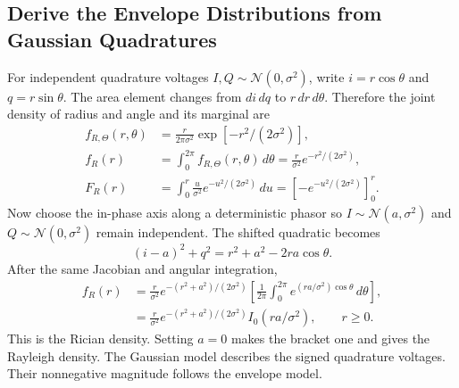 \documentclass[12pt,a4paper]{article}
\begin{document}
\subsection{Derive the Envelope Distributions from Gaussian Quadratures}
For independent quadrature voltages $I,Q\sim\mathcal N(0,\sigma^2)$, write $i=r\cos\theta$ and $q=r\sin\theta$. The area element changes from $di\,dq$ to $r\,dr\,d\theta$. Therefore the joint density of radius and angle and its marginal are
\[
\begin{aligned}
 f_{R,\Theta}(r,\theta)
   &=\frac{r}{2\pi\sigma^2}\exp[-r^2/(2\sigma^2)],\\
 f_R(r)&=\int_0^{2\pi} f_{R,\Theta}(r,\theta)\,d\theta
        =\frac{r}{\sigma^2}e^{-r^2/(2\sigma^2)},\\
 F_R(r)&=\int_0^r\frac{u}{\sigma^2}e^{-u^2/(2\sigma^2)}\,du
        =\left[-e^{-u^2/(2\sigma^2)}\right]_0^r .
\end{aligned}
\]
Now choose the in-phase axis along a deterministic phasor so $I\sim\mathcal N(a,\sigma^2)$ and $Q\sim\mathcal N(0,\sigma^2)$ remain independent. The shifted quadratic becomes
\[
 (i-a)^2+q^2=r^2+a^2-2ra\cos\theta.
\]
After the same Jacobian and angular integration,
\[
\begin{aligned}
 f_R(r)&=\frac r{\sigma^2}e^{-(r^2+a^2)/(2\sigma^2)}
          \left[\frac{1}{2\pi}\int_0^{2\pi}
                 e^{(ra/\sigma^2)\cos\theta}\,d\theta\right],\\
       &=\frac r{\sigma^2}e^{-(r^2+a^2)/(2\sigma^2)}
                       I_0(ra/\sigma^2),\qquad r\ge0.
\end{aligned}
\]
This is the Rician density. Setting $a=0$ makes the bracket one and gives the Rayleigh density. The Gaussian model describes the signed quadrature voltages. Their nonnegative magnitude follows the envelope model.
\end{document}
